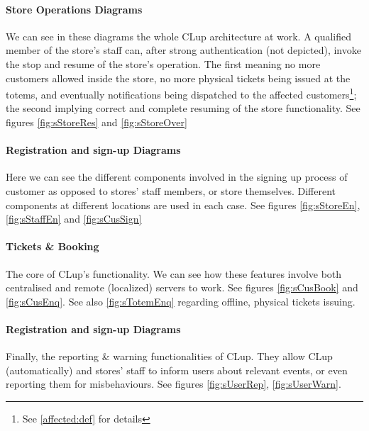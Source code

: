 

\paragraph{Store Operations Diagrams}
We can see in these diagrams the whole CLup architecture at work. A qualified member of the store's staff can, after strong authentication (not depicted), invoke the stop and resume of the store's operation. The first meaning no more customers allowed inside the store, no more physical tickets being issued at the totems, and eventually notifications being dispatched to the affected customers\footnote{See \ref{affected:def} \space for details}; the second implying correct and complete resuming of the store functionality. See figures \ref{fig:sStoreRes} \space and \ref{fig:sStoreOver}

\paragraph{Registration and sign-up Diagrams}
Here we can see the different components involved in the signing up process of customer as opposed to stores' staff members, or store themselves. Different components at different locations are used in each case. See figures \ref{fig:sStoreEn}, \ref{fig:sStaffEn} and \ref{fig:sCusSign}

\paragraph{Tickets \& Booking}
The core of CLup's functionality. We can see how these features involve both centralised and remote (localized) servers to work. See figures \ref{fig:sCusBook} \space and \ref{fig:sCusEnq}. \newline
See also \ref{fig:sTotemEnq} regarding offline, physical tickets issuing.

\paragraph{Registration and sign-up Diagrams}
Finally, the reporting \& warning functionalities of CLup. They allow CLup (automatically) and stores' staff to inform users about relevant events, or even reporting them for misbehaviours. See figures \ref{fig:sUserRep}, \ref{fig:sUserWarn}.

